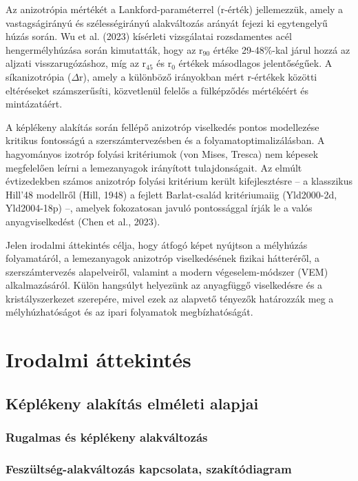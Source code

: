 \documentclass[12pt,a4paper,oneside]{report}
\begin{document}
Az anizotrópia mértékét a Lankford-paraméterrel (r-érték) jellemezzük, amely a vastagságirányú és szélességirányú alakváltozás arányát fejezi ki egytengelyű húzás során. Wu et al. (2023) kísérleti vizsgálatai rozsdamentes acél hengermélyhúzása során kimutatták, hogy az r$_{90}$ értéke 29-48\%-kal járul hozzá az aljzati visszarugózáshoz, míg az r$_{45}$ és r$_{0}$ értékek másodlagos jelentőségűek. A síkanizotrópia ($\Delta$r), amely a különböző irányokban mért r-értékek közötti eltéréseket számszerűsíti, közvetlenül felelős a fülképződés mértékéért és mintázatáért.

A képlékeny alakítás során fellépő anizotróp viselkedés pontos modellezése kritikus fontosságú a szerszámtervezésben és a folyamatoptimalizálásban. A hagyományos izotróp folyási kritériumok (von Mises, Tresca) nem képesek megfelelően leírni a lemezanyagok irányított tulajdonságait. Az elmúlt évtizedekben számos anizotróp folyási kritérium került kifejlesztésre – a klasszikus Hill'48 modellről (Hill, 1948) a fejlett Barlat-család kritériumaiig (Yld2000-2d, Yld2004-18p) –, amelyek fokozatosan javuló pontossággal írják le a valós anyagviselkedést (Chen et al., 2023).

Jelen irodalmi áttekintés célja, hogy átfogó képet nyújtson a mélyhúzás folyamatáról, a lemezanyagok anizotróp viselkedésének fizikai hátteréről, a szerszámtervezés alapelveiről, valamint a modern végeselem-módszer (VEM) alkalmazásáról. Külön hangsúlyt helyezünk az anyagfüggő viselkedésre és a kristályszerkezet szerepére, mivel ezek az alapvető tényezők határozzák meg a mélyhúzhatóságot és az ipari folyamatok megbízhatóságát.

\chapter{Irodalmi áttekintés}

\section{Képlékeny alakítás elméleti alapjai}
\subsection{Rugalmas és képlékeny alakváltozás}
\subsection{Feszültség-alakváltozás kapcsolata, szakítódiagram}
\end{document}
